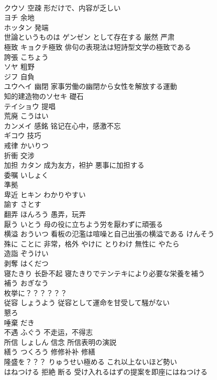 \documentclass[8pt]{extreport}
\begin{document}
\begin{CJK}{UTF8}{min}
\\	クウソ	空疎 形だけで、内容が乏しい
\\	ヨチ	余地
\\	ホッタン	発端
\\	世論というものは ゲンゼン として存在する	厳然 严肃
\\	極致	キョクチ極致 俳句の表現法は短詩型文学の極致である
\\	誇張	こちょう
\\	ソヤ	粗野
\\	ジフ	自負
\\	ユウヘイ	幽閉 家事労働の幽閉から女性を解放する運動
\\	知的建造物のソセキ	礎石
\\	テイショウ	提唱
\\	荒廃	こうはい
\\	カンメイ	感銘 铭记在心中，感激不忘
\\	ギコウ	技巧
\\	戒律	かいりつ
\\	折衝	交涉
\\	加担	カタン 成为友方，袒护 悪事に加担する
\\	委嘱	いしょく
\\	準拠	
\\	卑近	ヒキン わかりやすい
\\	諭す	さとす
\\	翻弄	ほんろう 愚弄，玩弄
\\	厭う	いとう 母の役に立ちよう労を厭わずに頑張る
\\	横溢	おういつ 看板の氾濫は喧噪と自己出張の横溢である けんそう
\\	殊に	ことに 非常，格外 やけに とりわけ 無性に やたら
\\	造詣	ぞうけい
\\	剥奪	はくだつ
\\	寝たきり	长卧不起 寝たきりでテンテキにより必要な栄養を補う
\\	補う	おぎなう
\\	枚挙に？？？？？？	
\\	従容	しょうよう 従容として運命を甘受して騒がない
\\	懇ろ	
\\	唾棄	だき
\\	不遇	ふぐう 不走运，不得志
\\	所信	しょしん 信念 所信表明の演説
\\	繕う	つくろう 修修补补 修繕
\\	隆盛を？？？	りゅうせい極める これ以上ないほど勢い
\\	はねつける	拒絶 断る 受け入れるはずの提案を即座にはねつける

\end{CJK}
\end{document}
